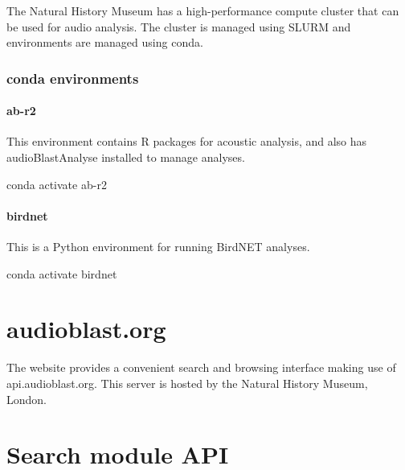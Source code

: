 \documentclass[
]{book}
\newenvironment{Shaded}{\begin{snugshade}}{\end{snugshade}}
\newcommand{\ExtensionTok}[1]{#1}
\newcommand{\NormalTok}[1]{#1}
\begin{document}
The Natural History Museum has a high-performance compute cluster that can be used for audio analysis. The cluster is managed using SLURM and environments are managed using conda.

\hypertarget{conda-environments}{%
\subsection{conda environments}\label{conda-environments}}

\hypertarget{ab-r2}{%
\subsubsection{ab-r2}\label{ab-r2}}

This environment contains R packages for acoustic analysis, and also has audioBlastAnalyse installed to manage analyses.

\begin{Shaded}
\begin{Highlighting}[]
\ExtensionTok{conda}\NormalTok{ activate ab{-}r2}
\end{Highlighting}
\end{Shaded}

\hypertarget{birdnet}{%
\subsubsection{birdnet}\label{birdnet}}

This is a Python environment for running BirdNET analyses.

\begin{Shaded}
\begin{Highlighting}[]
\ExtensionTok{conda}\NormalTok{ activate birdnet}
\end{Highlighting}
\end{Shaded}

\hypertarget{audioblast.org}{%
\chapter{audioblast.org}\label{audioblast.org}}

The website provides a convenient search and browsing interface making use of api.audioblast.org. This server is hosted by the Natural History Museum, London.

\hypertarget{search-module-api}{%
\chapter{Search module API}\label{search-module-api}}
\end{document}
